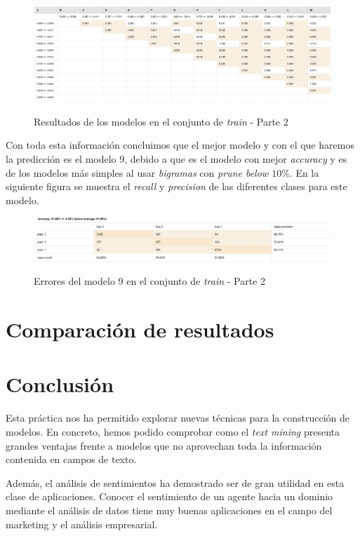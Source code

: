 \documentclass[es]{uc3mreport}
\begin{document}
\begin{report}
    \begin{figure}[H]
        \center
        \includegraphics[width=\linewidth]{t_test2.jpg}\\ 
        \caption{Resultados de los modelos en el conjunto de \textit{train} - Parte 2}
    \end{figure}

    Con toda esta información concluimos que el mejor modelo y con el que haremos
    la predicción es el modelo 9, debido a que es el modelo con mejor
    \textit{accuracy} y es de los modelos más simples al usar \textit{bigramas}
    con \textit{prune below $10\%$}. En la siguiente figura se muestra el 
    \textit{recall} y \textit{precision} de las diferentes clases para este modelo.

    \begin{figure}[H]
        \center
        \includegraphics[width=\linewidth]{train2.jpeg}\\ 
        \caption{Errores del modelo 9 en el conjunto de \textit{train} - Parte 2}
    \end{figure}

\section{Comparación de resultados}
\label{chap:resultados}

\section{Conclusión}
\label{chap:conclusion}

Esta práctica nos ha permitido explorar nuevas técnicas para la construcción de modelos. En concreto, hemos podido comprobar como el \textit{text mining} presenta grandes ventajas frente a modelos que no aprovechan toda la información contenida en campos de texto.

Además, el análisis de sentimientos ha demostrado ser de gran utilidad en esta clase de aplicaciones. Conocer el sentimiento de un agente hacia un dominio mediante el análisis de datos tiene muy buenas aplicaciones en el campo del marketing y el análisis empresarial.

  \end{report}
\end{document}
